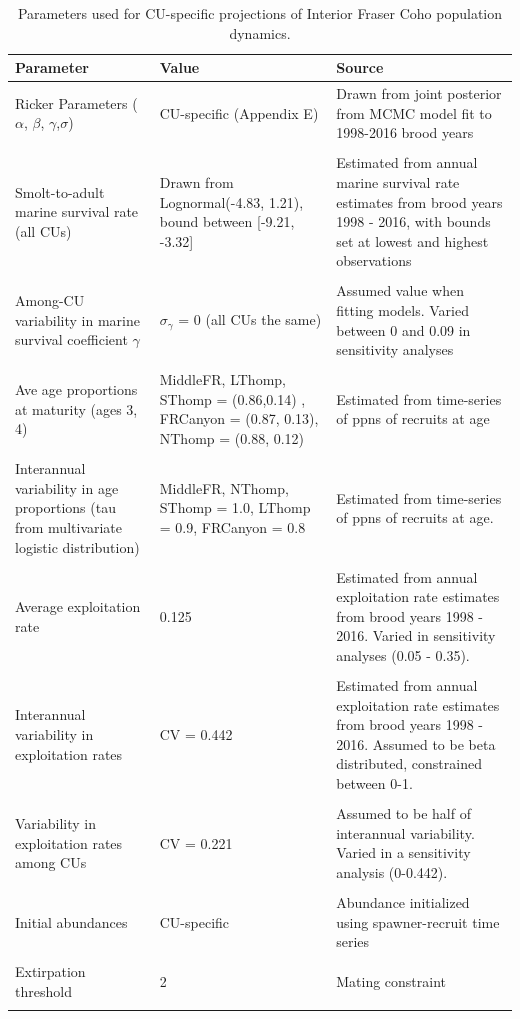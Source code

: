 \documentclass[11pt]{book}
\begin{document}
\begin{longtable}[]{p{3.7cm} p{5cm} p{6.3cm}}
\caption{Parameters used for CU-specific projections of Interior Fraser Coho population dynamics.}\\
\hline
Parameter & Value & Source \\ 
\hline
\endhead
\hline
 Ricker Parameters ($\alpha$, $\beta$, $\gamma$,$\sigma$)  &  CU-specific (Appendix E) & Drawn from joint posterior from MCMC model fit to 1998-2016 brood years
\\\\

Smolt-to-adult marine survival rate (all CUs) & Drawn from Lognormal(-4.83, 1.21), bound between [-9.21, -3.32]
 & Estimated from annual marine survival rate estimates from brood years 1998 - 2016, with bounds set at lowest and highest observations
\\\\  

 Among-CU variability in marine survival coefficient $\gamma$  &  $\sigma_{\gamma}$ = 0 (all CUs the same) & Assumed value when fitting models. Varied between 0 and 0.09 in sensitivity analyses
\\\\

 Ave age proportions at maturity (ages 3, 4) &  MiddleFR, LThomp, SThomp = (0.86,0.14) , FRCanyon = (0.87, 0.13), NThomp = (0.88, 0.12) & Estimated from time-series of ppns of recruits at age
 \\\\  

 Interannual variability in age proportions (tau from multivariate logistic distribution)  & MiddleFR, NThomp, SThomp = 1.0, LThomp = 0.9, FRCanyon = 0.8 & Estimated from time-series of ppns of recruits at age. \\\\

 Average exploitation rate & 0.125 & Estimated from annual exploitation rate estimates from brood years 1998 - 2016. Varied in sensitivity analyses (0.05 - 0.35).
 \\\\

Interannual variability in exploitation rates & CV = 0.442  & Estimated from annual exploitation rate estimates from brood years 1998 - 2016. Assumed to be beta distributed, constrained between 0-1.
\\\\

Variability in exploitation rates among CUs & CV = 0.221 & Assumed to be half of interannual variability. Varied in a sensitivity analysis (0-0.442).
\\\\ 

Initial abundances  & CU-specific & Abundance initialized using spawner-recruit time series
\\\\

Extirpation threshold &  2 & Mating constraint \\
\hline
\label{tab:coho-BaseProjectPars}
\end{longtable}
\end{document}
